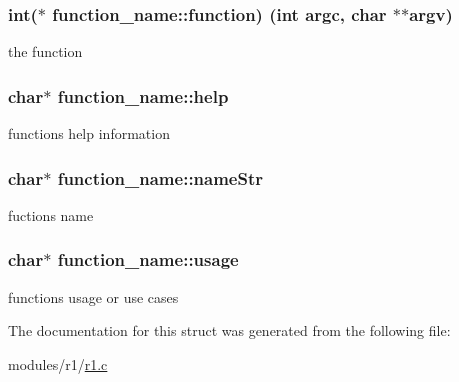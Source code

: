 \subsubsection[{\texorpdfstring{function}{function}}]{\setlength{\rightskip}{0pt plus 5cm}int($\ast$ function\+\_\+name\+::function) (int argc, char $\ast$$\ast$argv)}\hypertarget{structfunction__name_ad80214b3eea6c438c13ff5461c5350ab}{}\label{structfunction__name_ad80214b3eea6c438c13ff5461c5350ab}


the function 

\subsubsection[{\texorpdfstring{help}{help}}]{\setlength{\rightskip}{0pt plus 5cm}char$\ast$ function\+\_\+name\+::help}\hypertarget{structfunction__name_ac0f73e570d7d03a9f378a70e6d4d5632}{}\label{structfunction__name_ac0f73e570d7d03a9f378a70e6d4d5632}


function\textquotesingle{}s help information 

\subsubsection[{\texorpdfstring{name\+Str}{nameStr}}]{\setlength{\rightskip}{0pt plus 5cm}char$\ast$ function\+\_\+name\+::name\+Str}\hypertarget{structfunction__name_a7a94f7f31542a15b63160b6b213e0bcb}{}\label{structfunction__name_a7a94f7f31542a15b63160b6b213e0bcb}


fuction\textquotesingle{}s name 

\subsubsection[{\texorpdfstring{usage}{usage}}]{\setlength{\rightskip}{0pt plus 5cm}char$\ast$ function\+\_\+name\+::usage}\hypertarget{structfunction__name_a30f593e52febda0cc9d9703b9015fb0f}{}\label{structfunction__name_a30f593e52febda0cc9d9703b9015fb0f}


function\textquotesingle{}s usage or use cases 



The documentation for this struct was generated from the following file\+:\begin{DoxyCompactItemize}
\item 
modules/r1/\hyperlink{r1_8c}{r1.\+c}\end{DoxyCompactItemize}
